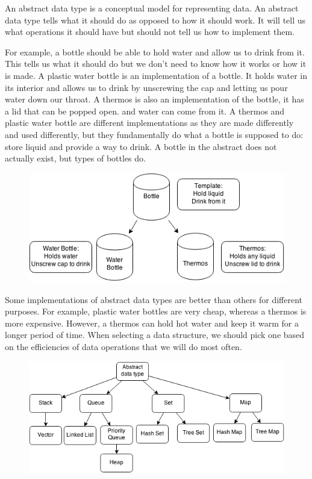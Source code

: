 \documentclass[11pt,oneside]{book}
\makeatletter
\def\maxwidth#1{\ifdim\Gin@nat@width>#1 #1\else\Gin@nat@width\fi}
\makeatother
\begin{document}
An abstract data type is a conceptual model for representing data. An abstract data type tells what it should do as opposed to how it should work. It will tell us what operations it should have but should not tell us how to implement them.

For example, a bottle should be able to hold water and allow us to drink from it. This tells us what it should do but we don't need to know how it works or how it is made. A plastic water bottle is an implementation of a bottle. It holds water in its interior and allows us to drink by unscrewing the cap and letting us pour water down our throat. A thermos is also an implementation of the bottle, it has a lid that can be popped open. and water can come from it. A thermos and plastic water bottle are different implementations as they are made differently and used differently, but they fundamentally do what a bottle is supposed to do: store liquid and provide a way to drink. A bottle in the abstract does not actually exist, but types of bottles do.

\vspace{5px}\begin{figure}[H]\centering
        \includegraphics[width=0.66\maxwidth{\textwidth}]{bottle.png}
        \end{figure}

Some implementations of abstract data types are better than others for different purposes. For example, plastic water bottles are very cheap, whereas a thermos is more expensive. However, a thermos can hold hot water and keep it warm for a longer period of time. When selecting a data structure, we should pick one based on the efficiencies of data operations that we will do most often.

\vspace{5px}\begin{figure}[H]\centering
        \includegraphics[width=0.66\maxwidth{\textwidth}]{adt.png}
        \end{figure}
\end{document}
